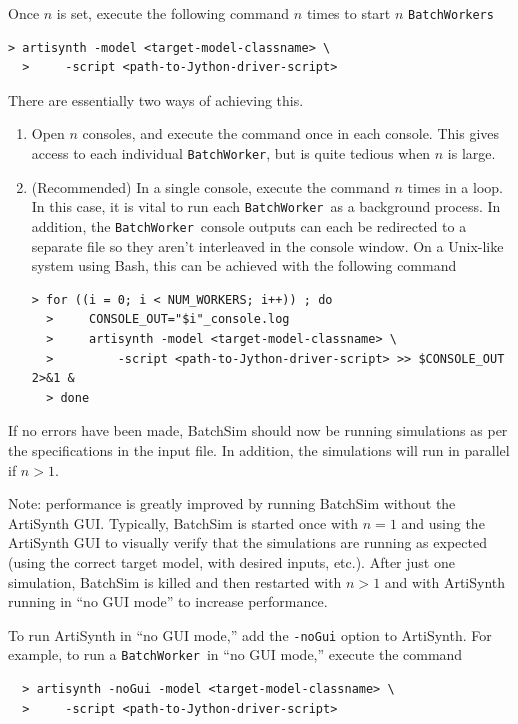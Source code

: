 \documentclass{article}
\newcommand{\BW}{{\tt BatchWorker}}
\newcommand{\BWs}{{\tt BatchWorkers}}
\begin{document}
Once $n$ is set, execute the following command $n$ times to start $n$ \BWs

\begin{lstlisting}[]
  > artisynth -model <target-model-classname> \
  >     -script <path-to-Jython-driver-script>
\end{lstlisting}

There are essentially two ways of achieving this.

\begin{enumerate}

\item Open $n$ consoles, and execute the command once in each console. This gives access to each individual \BW, but is quite tedious when $n$ is large.

\item (Recommended) In a single console, execute the command $n$ times in a loop. In this case, it is vital to run each \BW\ as a background process. In addition, the \BW\ console outputs can each be redirected to a separate file so they aren't interleaved in the console window. On a Unix-like system using Bash, this can be achieved with the following command

\begin{lstlisting}[]
  > for ((i = 0; i < NUM_WORKERS; i++)) ; do
  >     CONSOLE_OUT="$i"_console.log
  >     artisynth -model <target-model-classname> \
  >         -script <path-to-Jython-driver-script> >> $CONSOLE_OUT 2>&1 &
  > done
\end{lstlisting}

\end{enumerate}

If no errors have been made, BatchSim should now be running simulations as per the specifications in the input file. In addition, the simulations will run in parallel if $n > 1$.

\begin{sideblock}
Note: performance is greatly improved by running BatchSim without the ArtiSynth GUI. Typically, BatchSim is started once with $n = 1$ and using the ArtiSynth GUI to visually verify that the simulations are running as expected (using the correct target model, with desired inputs, etc.). After just one simulation, BatchSim is killed and then restarted with $n > 1$ and with ArtiSynth running in ``no GUI mode'' to increase performance.

To run ArtiSynth in ``no GUI mode,'' add the {\tt -noGui} option to ArtiSynth. For example, to run a \BW\ in ``no GUI mode,'' execute the command
\begin{verbatim}
  > artisynth -noGui -model <target-model-classname> \
  >     -script <path-to-Jython-driver-script>
\end{verbatim}
\end{sideblock}
\end{document}
